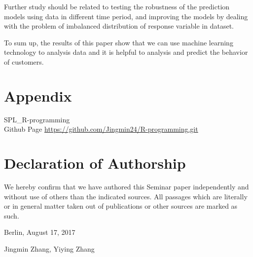 \documentclass[a4paper,11pt]{article}
\begin{document}
Further study should be related to testing the robustness of the prediction models using data in different time period, and improving the models by dealing with the problem of imbalanced distribution of response variable in dataset.

To sum up, the results of this paper show that we can use machine learning technology to analysis data and it is helpful to analysis and predict the behavior of customers. 

\newpage


\newpage
\section{Appendix}
SPL\_R-programming\\Github Page
\url{https://github.com/Jingmin24/R-programming.git}

\newpage
\section*{Declaration of Authorship}

We hereby confirm that we have authored this Seminar paper independently and without use of others than the indicated sources. All passages which are literally or in general matter taken out of publications or other sources are marked as such. 
\vspace{1cm}

Berlin, August 17, 2017 \vspace{0.5cm}

Jingmin Zhang, Yiying Zhang
\end{document}
